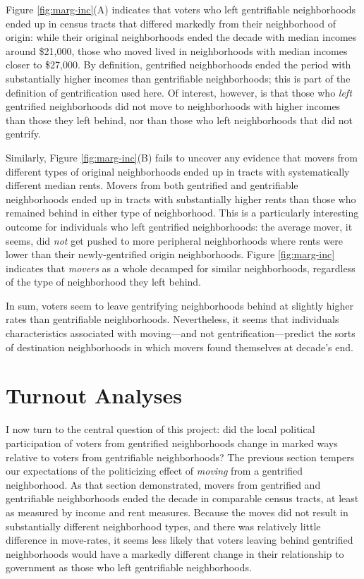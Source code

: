 \documentclass[
  12pt,
]{article}
\begin{document}
Figure \ref{fig:marg-inc}(A) indicates that voters who left gentrifiable neighborhoods ended up in census tracts that differed markedly from their neighborhood of origin: while their original neighborhoods ended the decade with median incomes around \$21,000, those who moved lived in neighborhoods with median incomes closer to \$27,000. By definition, gentrified neighborhoods ended the period with substantially higher incomes than gentrifiable neighborhoods; this is part of the definition of gentrification used here. Of interest, however, is that those who \emph{left} gentrified neighborhoods did not move to neighborhoods with higher incomes than those they left behind, nor than those who left neighborhoods that did not gentrify.

Similarly, Figure \ref{fig:marg-inc}(B) fails to uncover any evidence that movers from different types of original neighborhoods ended up in tracts with systematically different median rents. Movers from both gentrified and gentrifiable neighborhoods ended up in tracts with substantially higher rents than those who remained behind in either type of neighborhood. This is a particularly interesting outcome for individuals who left gentrified neighborhoods: the average mover, it seems, did \emph{not} get pushed to more peripheral neighborhoods where rents were lower than their newly-gentrified origin neighborhoods. Figure \ref{fig:marg-inc} indicates that \emph{movers} as a whole decamped for similar neighborhoods, regardless of the type of neighborhood they left behind.

In sum, voters seem to leave gentrifying neighborhoods behind at slightly higher rates than gentrifiable neighborhoods. Nevertheless, it seems that individuals characteristics associated with moving---and not gentrification---predict the sorts of destination neighborhoods in which movers found themselves at decade's end.

\hypertarget{turnout-analyses}{%
\section{Turnout Analyses}\label{turnout-analyses}}

I now turn to the central question of this project: did the local political participation of voters from gentrified neighborhoods change in marked ways relative to voters from gentrifiable neighborhoods? The previous section tempers our expectations of the politicizing effect of \emph{moving} from a gentrified neighborhood. As that section demonstrated, movers from gentrified and gentrifiable neighborhoods ended the decade in comparable census tracts, at least as measured by income and rent measures. Because the moves did not result in substantially different neighborhood types, and there was relatively little difference in move-rates, it seems less likely that voters leaving behind gentrified neighborhoods would have a markedly different change in their relationship to government as those who left gentrifiable neighborhoods.
\end{document}
